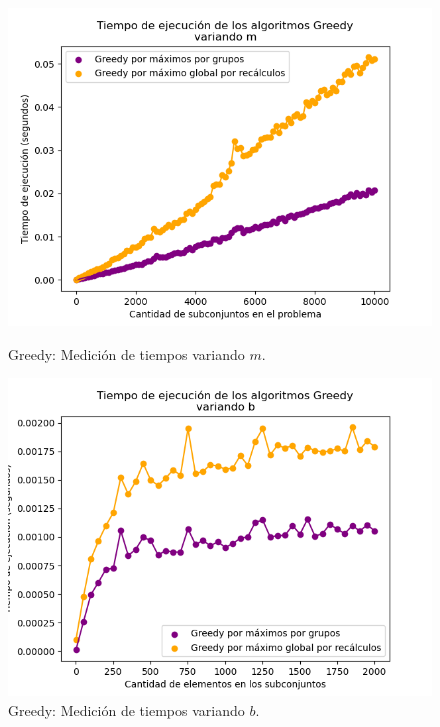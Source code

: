 \begin{figure}[h]
    \centering
    \begin{minipage}{0.45\textwidth}
        \centering
        \includegraphics[width=\textwidth]{img/medicion_t_greedy_var_m.png}
        \caption{Greedy: Medición de tiempos variando $m$.}
        \label{fig:medicion_t_greedy_var_m}
    \end{minipage}\hfill
    \begin{minipage}{0.45\textwidth}
        \centering
        \includegraphics[width=\textwidth]{img/medicion_t_greedy_var_b.png}
        \caption{Greedy: Medición de tiempos variando $b$.}
        \label{fig:medicion_t_greedy_var_b}
    \end{minipage}
\end{figure}

